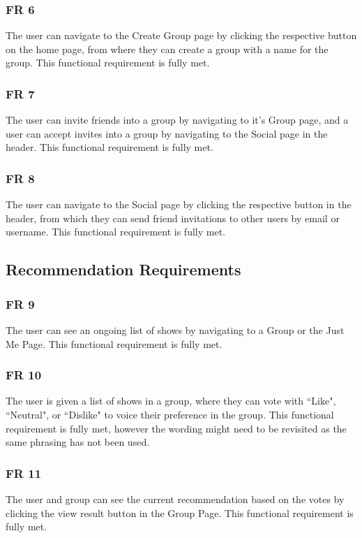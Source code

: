 \documentclass[12pt, titlepage]{article}
\begin{document}
\subsubsection{FR 6}
The user can navigate to the Create Group page by clicking the respective button on the home page, from where they can create a group with a name for the group. This functional requirement is fully met.

\subsubsection{FR 7}
The user can invite friends into a group by navigating to it's Group page, and a user can accept invites into a group by navigating to the Social page in the header. This functional requirement is fully met.

\subsubsection{FR 8}
The user can navigate to the Social page by clicking the respective button in the header, from which they can send friend invitations to other users by email or username. This functional requirement is fully met.

\subsection{Recommendation Requirements}
\subsubsection{FR 9}
The user can see an ongoing list of shows by navigating to a Group or the Just Me Page. This functional requirement is fully met.

\subsubsection{FR 10}
The user is given a list of shows in a group, where they can vote with ``Like", ``Neutral", or ``Dislike" to voice their preference in the group. This functional requirement is fully met, however the wording might need to be revisited as the same phrasing has not been used.

\subsubsection{FR 11}
The user and group can see the current recommendation based on the votes by clicking the view result button in the Group Page. This functional requirement is fully met.
\end{document}
